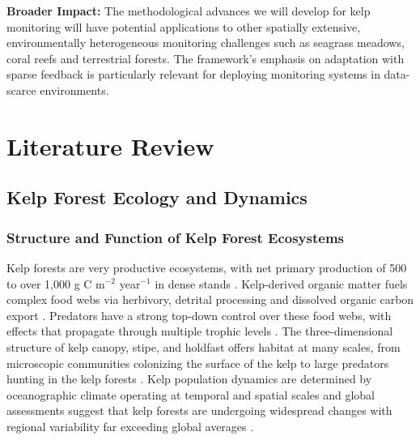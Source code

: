 \documentclass[12pt,oneside]{book}
\begin{document}
\textbf{Broader Impact:} The methodological advances we will develop for kelp monitoring will have potential applications to other spatially extensive, environmentally heterogeneous monitoring challenges such as seagrass meadows, coral reefs and terrestrial forests. The framework's emphasis on adaptation with sparse feedback is particularly relevant for deploying monitoring systems in data-scarce environments.


\chapter{Literature Review}
\label{ch:literature}

\section{Kelp Forest Ecology and Dynamics}
\label{sec:lit-kelp-ecology}

\subsection{Structure and Function of Kelp Forest Ecosystems}
\label{subsec:structure-function}

Kelp forests are very productive ecosystems, with net primary production of 500 to over 1,000 g C m$^{-2}$ year$^{-1}$ in dense stands \citep{Steneck2002, Mann1973}. Kelp-derived organic matter fuels complex food webs via herbivory, detrital processing and dissolved organic carbon export \citep{Duggins1989, Graham2004}. Predators have a strong top-down control over these food webs, with effects that propagate through multiple trophic levels \citep{Halpern2006}. The three-dimensional structure of kelp canopy, stipe, and holdfast offers habitat at many scales, from microscopic communities colonizing the surface of the kelp to large predators hunting in the kelp forests \citep{Dayton1985a, Teagle2017}. Kelp population dynamics are determined by oceanographic climate operating at temporal and spatial scales \citep{Dayton1999} and global assessments suggest that kelp forests are undergoing widespread changes with regional variability far exceeding global averages \citep{Krumhansl2016, Wernberg2019}.
\end{document}
